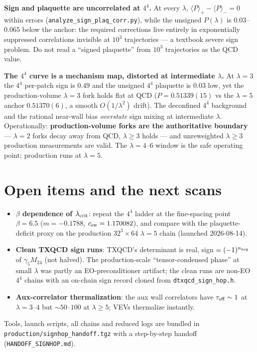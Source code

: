 \documentclass[11pt]{article}
\begin{document}
\noindent\textbf{Sign and plaquette are uncorrelated at $4^4$.}  At every $\lambda$,
$\langle P\rangle_{+}-\langle P\rangle_{-}=0$ within errors
(\texttt{analyze\_sign\_plaq\_corr.py}), while the unsigned $P(\lambda)$ is $0.03$--$0.065$
below the anchor: the required corrections live entirely in exponentially suppressed
correlations invisible at $10^3$ trajectories --- a textbook severe sign problem.  Do not read a
``signed plaquette'' from $10^3$ trajectories as the QCD value.

\noindent\textbf{The $4^4$ curve is a mechanism map, distorted at intermediate $\lambda$.}
At $\lambda=3$ the $4^4$ per-patch sign is $0.49$ and the unsigned $4^4$ plaquette is $0.03$ low,
yet the production-volume $\lambda=3$ fork holds flat at QCD
($P=0.51339(15)$ vs the $\lambda=5$ anchor $0.51370(6)$, a smooth $O(1/\lambda^2)$ drift).
The deconfined $4^4$ background and the rational near-wall bias \emph{overstate} sign mixing at
intermediate $\lambda$.  Operationally: \textbf{production-volume forks are the authoritative
boundary} --- $\lambda=2$ forks decay away from QCD, $\lambda\ge3$ holds --- and unreweighted
$\lambda\ge3$ production measurements are valid.  The $\lambda=4$--$6$ window is the safe
operating point; production runs at $\lambda=5$.

\section{Open items and the next scans}
\begin{itemize}
\item \textbf{$\beta$ dependence of $\lambda_{\rm crit}$}: repeat the $4^4$ ladder at the fine-spacing
  point $\beta=6.5$ ($m=-0.1788$, $c_{\rm sw}=1.170082$), and compare with the plaquette-deficit
  proxy on the production $32^3\times64$ $\lambda=5$ chain (launched 2026-08-14).
\item \textbf{Clean TXQCD sign runs}: TXQCD's determinant is real, sign $=(-1)^{n_{\rm neg}}$ of
  $\gamma_5 M_{24}$ (not halved).  The production-scale ``tensor-condensed phase'' at small
  $\lambda$ was partly an EO-preconditioner artifact; the clean runs are non-EO $4^4$ chains with
  an on-chain sign record cloned from \texttt{dtxqcd\_sign\_hop.h}.
\item \textbf{Aux-correlator thermalization}: the aux wall correlators have $\tau_{\rm eff}\sim1$ at
  $\lambda=3$--$4$ but $\sim50$--$100$ at $\lambda\ge5$; VEVs thermalize instantly.
\end{itemize}
Tools, launch scripts, all chains and reduced logs are bundled in
\texttt{production/signhop\_handoff.tgz} with a step-by-step handoff
(\texttt{HANDOFF\_SIGNHOP.md}).
\end{document}

